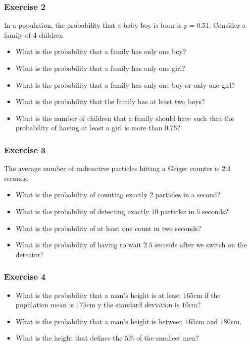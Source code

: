\documentclass[
]{book}
\providecommand{\tightlist}{%
  \setlength{\itemsep}{0pt}\setlength{\parskip}{0pt}}
\begin{document}
\hypertarget{exercise-2-4}{%
\subsubsection{Exercise 2}\label{exercise-2-4}}

In a population, the probability that a baby boy is born is \(p=0.51\). Consider a family of 4 children

\begin{itemize}
\tightlist
\item
  What is the probability that a family has only one boy?
\item
  What is the probability that a family has only one girl?
\item
  What is the probability that a family has only one boy or only one girl?
\item
  What is the probability that the family has at least two boys?
\item
  What is the number of children that a family should have such that the probability of having at least a girl is more than 0.75?
\end{itemize}

\hypertarget{exercise-3-2}{%
\subsubsection{Exercise 3}\label{exercise-3-2}}

The average number of radioactive particles hitting a Geiger counter is \(2.3\) seconds.

\begin{itemize}
\item
  What is the probability of counting exactly 2 particles in a second?
\item
  What is the probability of detecting exactly \(10\) particles in \(5\) seconds?
\item
  What is the probability of at least one count in two seconds?
\item
  What is the probability of having to wait \(2.5\) seconds after we switch on the detector?
\end{itemize}

\hypertarget{exercise-4-2}{%
\subsubsection{Exercise 4}\label{exercise-4-2}}

\begin{itemize}
\item
  What is the probability that a man's height is at least
  \(165\)cm if the population mean is \(175\)cm y the standard deviation is \(10\)cm?
\item
  What is the probability that a man's height is between
  \(165\)cm and \(180\)cm.
\item
  What is the height that defines the \(5\%\) of the smallest men?
\end{itemize}
\end{document}
